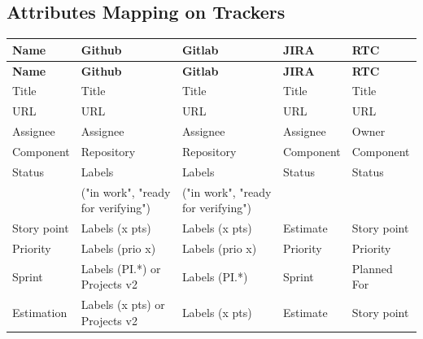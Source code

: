 \subsection{Attributes Mapping on Trackers}

\begin{longtable}{|l|l|l|l|l|}
   \hline
   \textbf{Name} & \textbf{Github} & \textbf{Gitlab} & \textbf{JIRA} & \textbf{RTC} \\
   \hline
   \endfirsthead

   \hline
   \textbf{Name} & \textbf{Github} & \textbf{Gitlab} & \textbf{JIRA} & \textbf{RTC} \\
   \hline
   \endhead

   Title & Title & Title & Title & Title \\
   \hline
   URL & URL & URL & URL & URL \\
   \hline
   Assignee & Assignee & Assignee & Assignee & Owner \\
   \hline
   Component & Repository & Repository & Component & Component \\
   \hline
   Status & Labels & Labels & Status & Status \\
   & ("in work", "ready for verifying") & ("in work", "ready for verifying") & & \\
   \hline
   Story point & Labels (x pts) & Labels (x pts) & Estimate & Story point \\
   \hline
   Priority & Labels (prio x) & Labels (prio x) & Priority & Priority \\
   \hline
   Sprint & Labels (PI.*) or Projects v2 & Labels (PI.*) & Sprint & Planned For \\
   \hline
   Estimation & Labels (x pts) or Projects v2 & Labels (x pts) & Estimate & Story point \\
   \hline
\end{longtable}